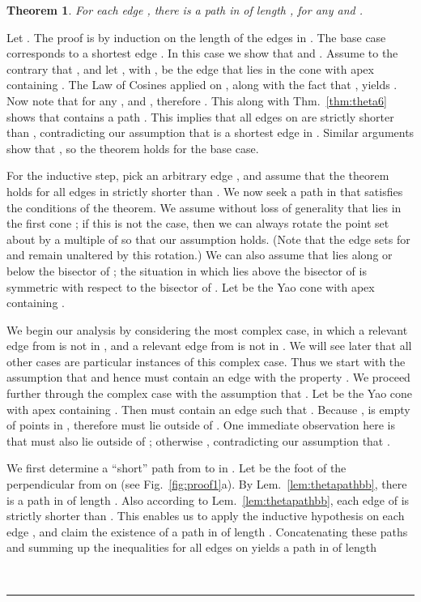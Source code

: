 \documentclass[11pt]{article}
\newtheorem{theorem}{{\bf Theorem}}
\newcommand{\qed}{\rule{0.5em}{1.5ex}}
\newcommand{\fqed}{{\hfill~\qed}}
\newenvironment{proof}{{\noindent \bf Proof.}}
                      {{\hfill \fqed} \vspace{1em}}
\begin{document}
\begin{theorem}
For each edge , there is a path  in  of length
, for any  and .
\label{thm:maintheta}
\end{theorem}
\begin{proof}
Let . The proof is by induction on the length of the edges in . The base case corresponds to a shortest edge .
In this case we show that  and . Assume to the contrary that
, and let , with , be the edge that lies in the cone  with apex  containing . The Law of Cosines applied on , along with the fact that , yields . Now note that for any ,  and , therefore . This along with Thm.~\ref{thm:theta6} shows that  contains a path . This implies that all edges on  are strictly shorter than , contradicting our assumption that  is a shortest edge in . Similar arguments show that , so the theorem holds for the base case.


For the inductive step, pick an arbitrary edge , and assume that the theorem holds for all edges in  strictly shorter than . We now seek a path  in  that satisfies the conditions of the theorem. We assume without loss of generality that  lies in the first cone ; if this is not the case, then we can always rotate the point set  about  by a multiple of  so that our assumption holds. (Note that the edge sets for  and  remain unaltered by this rotation.) We can also assume that  lies along or below the bisector of ; the situation in which  lies above the bisector of  is symmetric with respect to the bisector of .
Let  be the Yao cone with apex  containing .

We begin our analysis by considering the most complex case, in which a relevant edge from  is not in , and a relevant edge from  is not in . We will see later that all other cases are particular instances of this complex case. Thus we start with the assumption that  and hence  must contain an edge  with the property . We proceed further through the complex case with the assumption that . Let  be the Yao cone with apex  containing . Then  must contain an edge  such that . Because ,  is empty of points in , therefore  must lie outside of . One immediate observation here is that  must also lie outside of ; otherwise , contradicting our assumption that .

We first determine a ``short'' path from  to  in . Let  be the foot of the perpendicular from  on  (see Fig.~\ref{fig:proof1}a). By Lem.~\ref{lem:thetapathbb}, there is a path  in  of length . Also according to Lem.~\ref{lem:thetapathbb}, each edge of  is strictly shorter than . This enables us to apply the inductive hypothesis on each edge , and claim the existence of a path  in  of length . Concatenating these paths and summing up the inequalities for all edges on  yields a path  in  of length


\end{proof}
\end{document}
